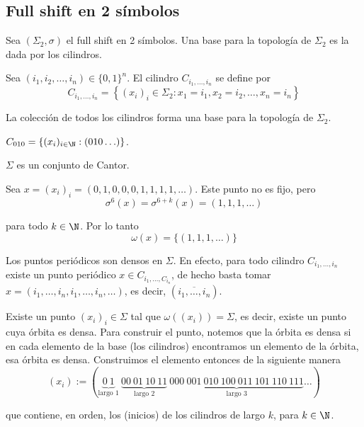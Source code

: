 \documentclass[	docname= Sistemas\ Din\'amicos,
				finished=1,
				semester=1,
				year=2017,
				professor=Godofredo\ Iommi,
				sigla=MAT2565]{apunte}
\begin{document}
\subsection{Full shift en 2 símbolos} 
Sea $(\Sigma_{2}, \sigma)$ el full shift en 2 símbolos. Una base para la topología de $\Sigma_{2}$ es la dada por los cilindros.

\begin{defn} Sea $(i_{1}, i_{2}, \ldots, i_{n}) \in \{0,1\}^{n}$. El cilindro $C_{i_{1}, \ldots, i_{n}}$ se define por
	$$C_{i_{1}, \ldots, i_{n}} = \left\{ (x_{i})_{i} \in \Sigma_{2} : x_{1} = i_{1}, x_{2} = i_{2}, \ldots, x_{n} = i_{n}\right\}$$

La colección de todos los cilindros forma una base para la topología de $\Sigma_{2}$.
\end{defn}

\begin{ex} $C_{010} = \{(x_{i})_{i \in \N} : (010\ldots) \}$.
\end{ex}

\begin{obs*} $\Sigma$ es un conjunto de Cantor.
\end{obs*}

Sea $x = (x_{i})_{i} = (0,1,0,0,0,1,1,1,1,\ldots)$. Este punto no es fijo, pero
	$$\sigma^{6}(x) = \sigma^{6+k}(x) = (1,1,1,\ldots)$$

para todo $k \in \N$. Por lo tanto
	$$\omega(x) = \{(1,1,1,\ldots) \}$$

\begin{obs} Los puntos periódicos son densos en $\Sigma$. En efecto, para todo cilindro $C_{i_{1}, \ldots, i_{n}}$ existe un punto periódico $x \in C_{i_{1}, \ldots, C_{i_{n}}}$, de hecho basta tomar $x = (i_{1}, \ldots, i_{n}, i_{1}, \ldots, i_{n}, \ldots)$, es decir, $(\overline{i_{1}, \ldots, i_{n}})$.
\end{obs}

\begin{obs} Existe un punto $(x_{i})_{i} \in \Sigma$ tal que $\omega((x_{i})) = \Sigma$, es decir, existe un punto cuya órbita es densa. Para construir el punto, notemos que la órbita es densa si en cada elemento de la base (los cilindros) encontramos un elemento de la órbita, esa órbita es densa. Construimos el elemento entonces de la siguiente manera
	$$(x_{i}) := (\underbrace{0 \ 1}_{\text{largo 1}} \ \underbrace{00 \ 01 \ 10 \ 11}_{\text{largo 2}} \ \underbrace{000 \ 001 \ 010 \ 100 \ 011 \ 101 \ 110 \ 111}_{\text{largo 3}} \ldots)$$

que contiene, en orden, los (inicios) de los cilindros de largo $k$, para $k \in \N$.
\end{obs}
\end{document}
